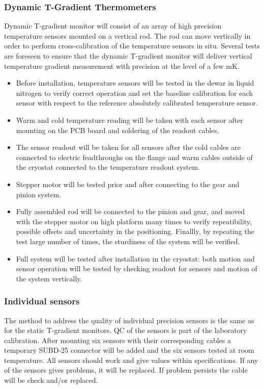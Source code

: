 \subsubsection{Dynamic T-Gradient Thermometers}
\label{sec:fdgen-slow-cryo-qc-thdy}

Dynamic T-gradient monitor will consist of an array of high precision temperature sensors mounted on a vertical rod. The rod can move vertically in order to perform cross-calibration of the temperature sensors in situ. Several tests are foreseen to ensure that the dynamic T-gradient monitor will deliver vertical temperature gradient measurement with precision at the level of a few mK.

\begin{itemize}
\item
Before installation, temperature sensors will be tested in the dewar in liquid nitrogen to verify correct operation and set the baseline calibration for each sensor with respect to the reference absolutely calibrated temperature sensor.
\item
Warm and cold temperature reading will be taken with each sensor after mounting on the PCB board and soldering of the readout cables.
\item
The sensor readout will be taken for all sensors after the cold cables are connected to electric feadthroughs on the flange and warm cables outside of the cryostat connected to the temperature readout system.
\item 
Stepper motor will be tested prior and after connecting to the gear and pinion system.
\item
Fully assembled rod will be connected to the pinion and gear, and moved with the stepper motor on high platform many times to verify repeatibility, possible offsets and uncertainty in the positioning. Finallly, by repeating the test large number of times, the sturdiness of the system will be verified.
\item
Full system will be tested after installation in the cryostat: both motion and sensor operation will be tested by checking readout for sensors and motion of the system vertically.
\end{itemize} 

\subsubsection{Individual sensors}
\label{sec:fdgen-slow-cryo-qc-is}

The method to address the quality of individual precision sensors is the same as for the static T-gradient monitors.
QC of the sensors is part of the laboratory calibration. After mounting six sensors with their corresponding cables a
temporary SUBD-25 connector will be added and the six sensors tested at room temperature. All sensors should work and give values within specifications.  
If any of the sensors gives problems, it will be replaced. If problem persists the cable will be check and/or replaced.

